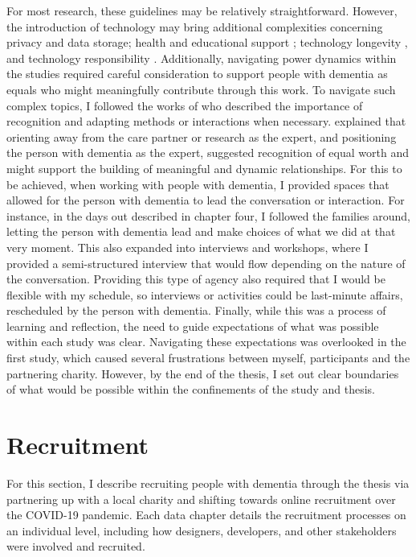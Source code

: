 For most research, these guidelines may be relatively straightforward. However, the introduction of technology may bring additional complexities concerning privacy and data storage; health and educational support \citep{gray2016inscribing}; technology longevity \citep{foley_printer_2019}, and technology responsibility \citep{ferrario_software_2014}. Additionally, navigating power dynamics within the studies required careful consideration to support people with dementia as equals who might meaningfully contribute through this work. To navigate such complex topics, I followed the works of \cite{nolan_beyond_2004,bartlett_personhood_2007,keady_involving_2007} who described the importance of recognition and adapting methods or interactions when necessary. \cite{nolan2002towards} explained that orienting away from the care partner or research as the expert, and positioning the person with dementia as the expert, suggested recognition of equal worth and might support the building of meaningful and dynamic relationships. For this to be achieved, when working with people with dementia, I provided spaces that allowed for the person with dementia to lead the conversation or interaction. For instance, in the days out described in chapter four, I followed the families around, letting the person with dementia lead and make choices of what we did at that very moment. This also expanded into interviews and workshops, where I provided a semi-structured interview that would flow depending on the nature of the conversation. Providing this type of agency also required that I would be flexible with my schedule, so interviews or activities could be last-minute affairs, rescheduled by the person with dementia. Finally, while this was a process of learning and reflection, the need to guide expectations of what was possible within each study was clear. Navigating these expectations was overlooked in the first study, which caused several frustrations between myself, participants and the partnering charity. However, by the end of the thesis, I set out clear boundaries of what would be possible within the confinements of the study and thesis.

\section{Recruitment}
\label{Method:Recruitment}
For this section, I describe recruiting people with dementia through the thesis via partnering up with a local charity and shifting towards online recruitment over the COVID-19 pandemic. Each data chapter details the recruitment processes on an individual level, including how designers, developers, and other stakeholders were involved and recruited.

